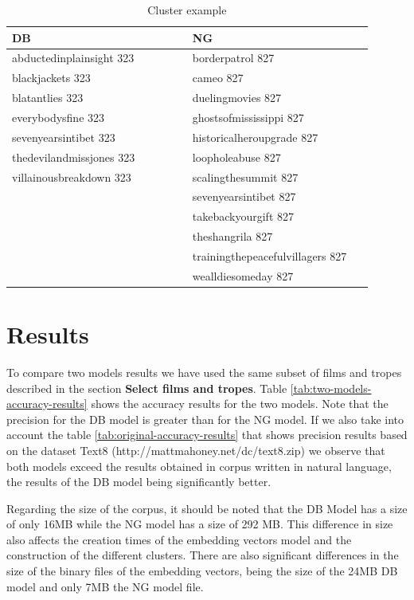 \documentclass[letterpaper]{article}
\begin{document}
	
	\begin{table}[t]
	\centering
	\begin{tabular}{|p{0.45\linewidth}|p{0.45\linewidth}|}
	\hline
	\textbf{DB} & \textbf{NG}\\
	\hline
	\hline
	abductedinplainsight 323 & borderpatrol 827\\
	blackjackets 323 & cameo 827\\
	blatantlies 323 & duelingmovies 827\\
	everybodysfine 323 & ghostsofmississippi 827\\
	sevenyearsintibet 323 & historicalheroupgrade 827\\
	thedevilandmissjones 323 & loopholeabuse 827 \\
	villainousbreakdown 323 & scalingthesummit 827 \\
	 & sevenyearsintibet 827\\
	 & takebackyourgift 827\\
	 & theshangrila 827\\
	 & trainingthepeacefulvillagers 827\\
	 & wealldiesomeday 827\\
\hline 

\end{tabular}
\caption{Cluster example}
\label{tab:cluster-example}
\end{table}    
	
	
	\section{Results}
	\label{sec:res}
	
	
    To compare two models results we have used the same subset of films and tropes described in the section \textbf{Select films and tropes}. 
    Table \ref{tab:two-models-accuracy-results} shows the accuracy results for the two models. Note that the precision for the DB model is greater than for the NG model. 
    If we also take into account the table \ref{tab:original-accuracy-results} that shows precision results based on the dataset Text8 (http://mattmahoney.net/dc/text8.zip) we observe that both models exceed the results obtained in corpus written in natural language, the results of the DB model being significantly better.
	
	
	Regarding the size of the corpus, it should be noted that the DB Model has a size of only 16MB while the NG model has a size of 292 MB. This difference in size also affects the creation times of the embedding vectors model and the construction of the different clusters. There are also significant differences in the size of the binary files of the embedding vectors, being the size of the 24MB DB model and only 7MB the NG model file.
\end{document}
